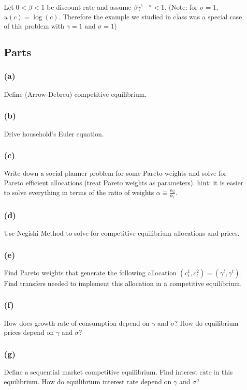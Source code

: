 \documentclass[10pt, a4paper]{article}
\begin{document}
Let $0 < \beta < 1$ be discount rate and assume $\beta\gamma^{1-\sigma} < 1$. (Note: for $\sigma = 1$, $u(c) = \log(c)$. Therefore the example we studied in class was a special case of this problem with $\gamma = 1$ and $\sigma = 1$)

\subsection*{Parts}
\subsubsection*{(a)}
Define (Arrow-Debreu) competitive equilibrium.

\subsubsection*{(b)}
Drive household's Euler equation.

\subsubsection*{(c)}
Write down a social planner problem for some Pareto weights and solve for Pareto efficient allocations (treat Pareto weights as parameters). hint: it is easier to solve everything in terms of the ratio of weights $\alpha \equiv \frac{\alpha_2}{\alpha_1}$.

\subsubsection*{(d)}
Use Negishi Method to solve for competitive equilibrium allocations and prices.

\subsubsection*{(e)}
Find Pareto weights that generate the following allocation $(c^1_t, c^2_t) = (\gamma^t, \gamma^t)$. Find transfers needed to implement this allocation in a competitive equilibrium.

\subsubsection*{(f)}
How does growth rate of consumption depend on $\gamma$ and $\sigma$? How do equilibrium prices depend on $\gamma$ and $\sigma$?

\subsubsection*{(g)}
Define a sequential market competitive equilibrium. Find interest rate in this equilibrium. How do equilibrium interest rate depend on $\gamma$ and $\sigma$?
\end{document}
